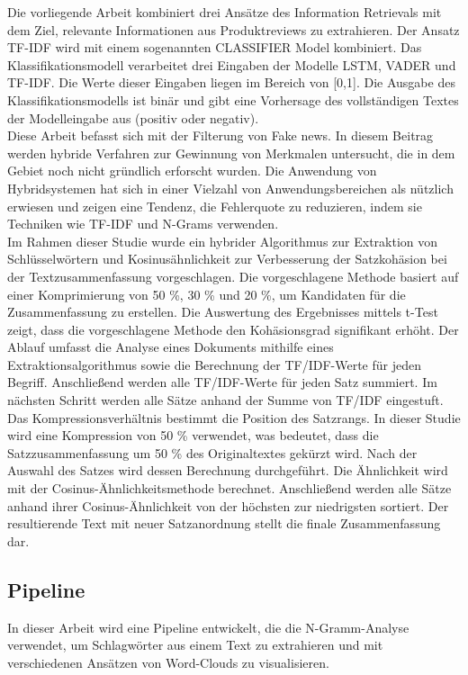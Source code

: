 Die vorliegende Arbeit kombiniert drei Ansätze des Information Retrievals mit dem Ziel, relevante Informationen aus Produktreviews zu extrahieren. Der Ansatz TF-IDF wird mit einem sogenannten CLASSIFIER Model kombiniert. Das Klassifikationsmodell verarbeitet drei Eingaben der Modelle LSTM, VADER und TF-IDF. Die Werte dieser Eingaben liegen im Bereich von [0,1]. Die Ausgabe des Klassifikationsmodells ist binär und gibt eine Vorhersage des vollständigen Textes der Modelleingabe aus (positiv oder negativ).\cite{chiny2021lstm}\\

Diese Arbeit befasst sich mit der Filterung von Fake news. In diesem Beitrag werden hybride Verfahren zur Gewinnung von Merkmalen untersucht, die in dem Gebiet noch nicht gründlich erforscht wurden. Die Anwendung von Hybridsystemen hat sich in einer Vielzahl von Anwendungsbereichen als nützlich erwiesen und zeigen eine Tendenz, die Fehlerquote zu reduzieren, indem sie Techniken wie TF-IDF und N-Grams verwenden.\cite{suhasini2021hybrid}\\

Im Rahmen dieser Studie wurde ein hybrider Algorithmus zur Extraktion von Schlüsselwörtern und Kosinusähnlichkeit zur Verbesserung der Satzkohäsion bei der Textzusammenfassung vorgeschlagen. Die vorgeschlagene Methode basiert auf einer Komprimierung von 50 \%, 30 \% und 20 \%, um Kandidaten für die Zusammenfassung zu erstellen. Die Auswertung des Ergebnisses mittels t-Test zeigt, dass die vorgeschlagene Methode den Kohäsionsgrad signifikant erhöht.
Der Ablauf umfasst die Analyse eines Dokuments mithilfe eines Extraktionsalgorithmus sowie die Berechnung der TF/IDF-Werte für jeden Begriff. Anschließend werden alle TF/IDF-Werte für jeden Satz summiert. Im nächsten Schritt werden alle Sätze anhand der Summe von TF/IDF eingestuft. Das Kompressionsverhältnis bestimmt die Position des Satzrangs. In dieser Studie wird eine Kompression von 50 \% verwendet, was bedeutet, dass die Satzzusammenfassung um 50 \% des Originaltextes gekürzt wird. Nach der Auswahl des Satzes wird dessen Berechnung durchgeführt. Die Ähnlichkeit wird mit der Cosinus-Ähnlichkeitsmethode berechnet. Anschließend werden alle Sätze anhand ihrer Cosinus-Ähnlichkeit von der höchsten zur niedrigsten sortiert. Der resultierende Text mit neuer Satzanordnung stellt die finale Zusammenfassung dar.\cite{darmawan2015hybrid}\\

\subsection{Pipeline}
In dieser Arbeit wird eine Pipeline entwickelt, die die N-Gramm-Analyse verwendet, um Schlagwörter aus einem Text zu extrahieren und mit verschiedenen Ansätzen von Word-Clouds zu visualisieren.\cite{pirk2019implementierung}\\

